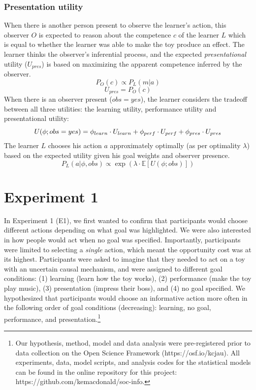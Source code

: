 \documentclass[10pt, letterpaper]{article}
\begin{document}
\subsubsection{Presentation utility}\label{presentation-utility}

When there is another person present to observe the learner's action,
this observer \(O\) is expected to reason about the competence \(c\) of
the learner \(L\) which is equal to whether the learner was able to make
the toy produce an effect. The learner thinks the observer's inferential
process, and the expected \emph{presentational} utility (\(U_{pres}\))
is based on maximizing the apparent competence inferred by the observer.
\[ P_O(c) \propto P_L(m | a)\] \[ U_{pres} = P_O(c)\] When there is an
observer present (\(obs = yes\)), the learner considers the tradeoff
between all three utilities: the learning utility, performance utility
and presentational utility:
\[ U(\phi; obs = yes) = \phi_{learn} \cdot U_{learn} + \\ \phi_{perf} \cdot U_{perf} + \phi_{pres} \cdot U_{pres}\]
The learner \(L\) chooses his action \(a\) approximately optimally (as
per optimality \(\lambda\)) based on the expected utility given his goal
weights and observer presence.
\[ P_L(a | \phi, obs) \propto \exp(\lambda \cdot \mathbb{E}[U(\phi; obs)])\]

\section{Experiment 1}\label{experiment-1}

In Experiment 1 (E1), we first wanted to confirm that participants would
choose different actions depending on what goal was highlighted. We were
also interested in how people would act when no goal was specified.
Importantly, participants were limited to selecting a \emph{single}
action, which meant the opportunity cost was at its highest.
Participants were asked to imagine that they needed to act on a toy with
an uncertain causal mechanism, and were assigned to different goal
conditions: (1) learning (learn how the toy works), (2) performance
(make the toy play music), (3) presentation (impress their boss), and
(4) no goal specified. We hypothesized that participants would choose an
informative action more often in the following order of goal conditions
(decreasing): learning, no goal, performance, and
presentation.\footnote{Our hypothesis, method, model and data analysis were pre-registered prior to data collection on the Open Science Framework (https://osf.io/kcjau). All experiments, data, model scripts, and analysis codes for the statistical models can be found in the online repository for this project: https://github.com/kemacdonald/soc-info.}
\end{document}
